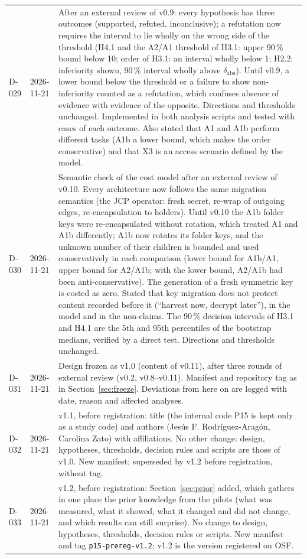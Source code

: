 \documentclass[11pt,a4paper]{article}
\begin{document}
\begin{longtable}{l l p{11.5cm}}
D-029 & 2026-11-21 & After an external review of v0.9: every hypothesis has three outcomes (supported, refuted, inconclusive); a refutation now requires the interval to lie wholly on the wrong side of the threshold (H4.1 and the A2/A1 threshold of H3.1: upper 90\,\% bound below 10; order of H3.1: an interval wholly below 1; H2.2: inferiority shown, 90\,\% interval wholly above $\delta_{\mathrm{abs}}$). Until v0.9, a lower bound below the threshold or a failure to show non-inferiority counted as a refutation, which confuses absence of evidence with evidence of the opposite. Directions and thresholds unchanged. Implemented in both analysis scripts and tested with cases of each outcome. Also stated that A1 and A1b perform different tasks (A1b a lower bound, which makes the order conservative) and that X3 is an access scenario defined by the model.\\
D-030 & 2026-11-21 & Semantic check of the cost model after an external review of v0.10. Every architecture now follows the same migration semantics (the JCP operator: fresh secret, re-wrap of outgoing edges, re-encapsulation to holders). Until v0.10 the A1b folder keys were re-encapsulated without rotation, which treated A1 and A1b differently; A1b now rotates its folder keys, and the unknown number of their children is bounded and used conservatively in each comparison (lower bound for A1b/A1, upper bound for A2/A1b; with the lower bound, A2/A1b had been anti-conservative). The generation of a fresh symmetric key is costed as zero. Stated that key migration does not protect content recorded before it (``harvest now, decrypt later''), in the model and in the non-claims. The 90\,\% decision intervals of H3.1 and H4.1 are the 5th and 95th percentiles of the bootstrap medians, verified by a direct test. Directions and thresholds unchanged.\\
D-031 & 2026-11-21 & Design frozen as v1.0 (content of v0.11), after three rounds of external review (v0.2, v0.8--v0.11). Manifest and repository tag as in Section~\ref{sec:freeze}. Deviations from here on are logged with date, reason and affected analyses.\\
D-032 & 2026-11-21 & v1.1, before registration: title (the internal code P15 is kept only as a study code) and authors (Jesús F. Rodríguez-Aragón, Carolina Zato) with affiliations. No other change: design, hypotheses, thresholds, decision rules and scripts are those of v1.0. New manifest; superseded by v1.2 before registration, without tag.\\
D-033 & 2026-11-21 & v1.2, before registration: Section~\ref{sec:prior} added, which gathers in one place the prior knowledge from the pilots (what was measured, what it showed, what it changed and did not change, and which results can still surprise). No change to design, hypotheses, thresholds, decision rules or scripts. New manifest and tag \texttt{p15-prereg-v1.2}; v1.2 is the version registered on OSF.\\
\bottomrule
\end{longtable}
\end{document}
